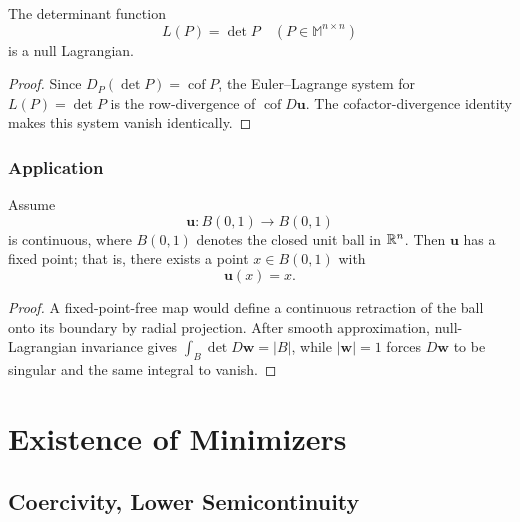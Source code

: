\begin{theorem}
\label{thm:determinant-null-lagrangian}

The determinant function
\[
L(P) = \det P \quad (P \in \mathbb{M}^{n \times n})
\]
is a null Lagrangian.
\end{theorem}

\begin{proof}
\sketch Since $D_P(\det P)=\operatorname{cof}P$, the Euler--Lagrange system for $L(P)=\det P$ is the row-divergence of $\operatorname{cof}D\mathbf u$. The cofactor-divergence identity makes this system vanish identically.
\end{proof}

\subsubsection{Application}

\begin{theorem}
\label{thm:brouwer-fixed-point-theorem}

Assume
\[
\mathbf{u} : B(0,1) \to B(0,1)
\]
is continuous, where $B(0,1)$ denotes the closed unit ball in $\mathbb{R}^n$. Then $\mathbf{u}$ has a fixed point; that is, there exists a point $x \in B(0,1)$ with
\[
\mathbf{u}(x) = x.
\]
\end{theorem}

\begin{proof}
\sketch A fixed-point-free map would define a continuous retraction of the ball onto its boundary by radial projection. After smooth approximation, null-Lagrangian invariance gives $\int_B\det D\mathbf w=|B|$, while $|\mathbf w|=1$ forces $D\mathbf w$ to be singular and the same integral to vanish.
\end{proof}

\section{Existence of Minimizers}
\label{sec:existence-of-minimizers}

\subsection{Coercivity, Lower Semicontinuity}
\label{sec:coercivity-lower-semicontinuity}

